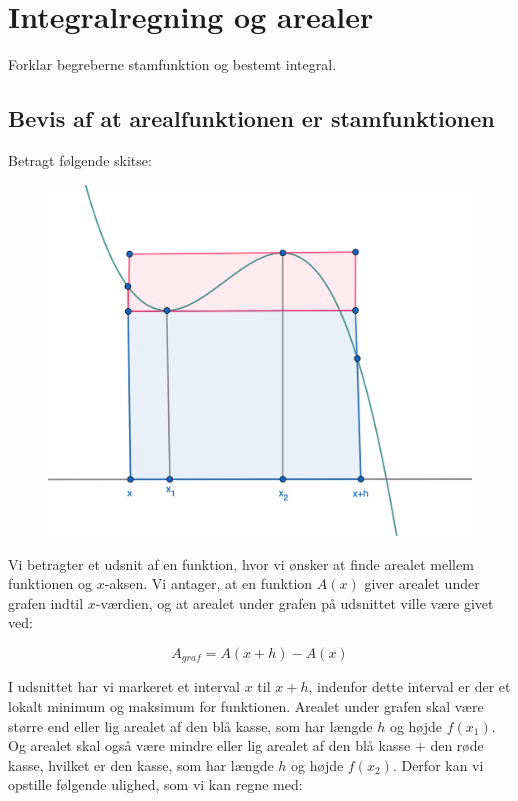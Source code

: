 
\section{Integralregning og arealer}
Forklar begreberne stamfunktion og bestemt integral.
\subsection{Bevis af at arealfunktionen er stamfunktionen}

\begin{proofw}
    
Betragt følgende skitse:

\begin{figure}[h]
    \centering
    \includegraphics[scale=0.3]{skitser/areal_funktion.png}
\end{figure}

Vi betragter et udsnit af en funktion,
hvor vi ønsker at finde arealet mellem funktionen og $x$-aksen.
Vi antager, at en funktion $A(x)$ giver arealet under grafen indtil $x$-værdien,
og at arealet under grafen på udsnittet ville være givet ved:

$$
    A_{graf}=A(x+h)-A(x)
$$

I udsnittet har vi markeret et interval $x$ til $x+h$,
indenfor dette interval er der et lokalt minimum og maksimum for funktionen.
Arealet under grafen skal være større end eller lig arealet af den blå kasse,
som har længde $h$ og højde $f(x_1)$.
Og arealet skal også være mindre eller lig
arealet af den blå kasse + den røde kasse,
hvilket er den kasse, som har længde $h$ og højde $f(x_2)$.
Derfor kan vi opstille følgende ulighed, som vi kan regne med:


\end{proofw}
